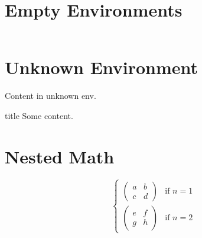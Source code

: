 \documentclass{article}
\begin{document}
\section{Empty Environments}
\begin{equation}
\end{equation}

\begin{itemize}
\end{itemize}

\section{Unknown Environment}
\begin{myenv}
Content in unknown env.
\end{myenv}

\begin{customblock}{title}
Some content.
\end{customblock}

\section{Nested Math}
\begin{equation}
\begin{cases}
\begin{pmatrix}
a & b \\
c & d
\end{pmatrix} & \text{if } n = 1 \\
\begin{pmatrix}
e & f \\
g & h
\end{pmatrix} & \text{if } n = 2
\end{cases}
\end{equation}
\end{document}
